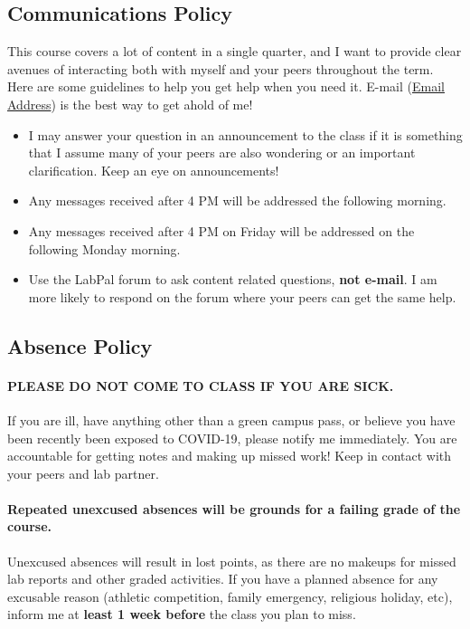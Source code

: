 \documentclass{article}
\begin{document}
\subsection*{Communications Policy}
This course covers a lot of content in a single quarter, and I want to provide clear avenues of interacting both with myself and  your peers throughout the term.  Here are some guidelines to help you get help when you need it. E-mail (\href{mailto:Email Address}{Email Address}) is the best way to get ahold of me!

\begin{itemize}[noitemsep]
	\item{I may answer your question in an announcement to the class if it is something that I assume many of your peers are also wondering or an important clarification. Keep an eye on announcements!}
	\item{Any messages received after 4 PM will be addressed the following morning.}
	\item{Any messages received after 4 PM on Friday will be addressed on the following Monday morning.}
	\item{Use the LabPal forum to ask content related questions, \textbf{not e-mail}. I am more likely to respond on the forum where your peers can get the same help.}
\end{itemize}

\subsection*{Absence Policy}
\paragraph{PLEASE DO NOT COME TO CLASS IF YOU ARE SICK.} If you are ill, have anything other than a green campus pass, or believe you have been recently been exposed to COVID-19, please notify me immediately.  You are accountable for getting notes and making up missed work!  Keep in contact with your peers and lab partner.

\paragraph{Repeated unexcused absences will be grounds for a failing grade of the course.} Unexcused absences will result in lost points, as there are no makeups for missed lab reports and other graded activities.
If you have a planned absence for any excusable reason (athletic competition, family emergency, religious holiday, etc), inform me at \textbf{least 1 week before} the class you plan to miss.
\end{document}
